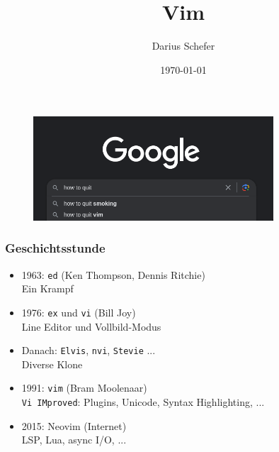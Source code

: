 \documentclass{beamer}
\title{Vim}
\author{Darius Schefer}
\date{\today}
\begin{document}
\begin{frame}
  \titlepage
  \begin{figure}
    \includegraphics[width=0.8\textwidth]{how_to_quit_vim}
  \end{figure}
\end{frame}

\begin{frame}
  \frametitle{Geschichtsstunde}
  \begin{itemize}
    \item 1963: \texttt{ed} (Ken Thompson, Dennis Ritchie) \\
      Ein Krampf \\[0.4cm]
    \item 1976: \texttt{ex} und \texttt{vi} (Bill Joy) \\
      Line Editor und Vollbild-Modus \\[0.4cm]
    \item Danach: \texttt{Elvis}, \texttt{nvi}, \texttt{Stevie} ... \\
      Diverse Klone \\[0.4cm]
    \item 1991: \texttt{vim} (Bram Moolenaar) \\
      \texttt{Vi IMproved}: Plugins, Unicode, Syntax Highlighting, ...  \\[0.4cm]
    \item 2015: Neovim (Internet) \\
      LSP, Lua, async I/O, ... \\
  \end{itemize}
\end{frame}
\end{document}
